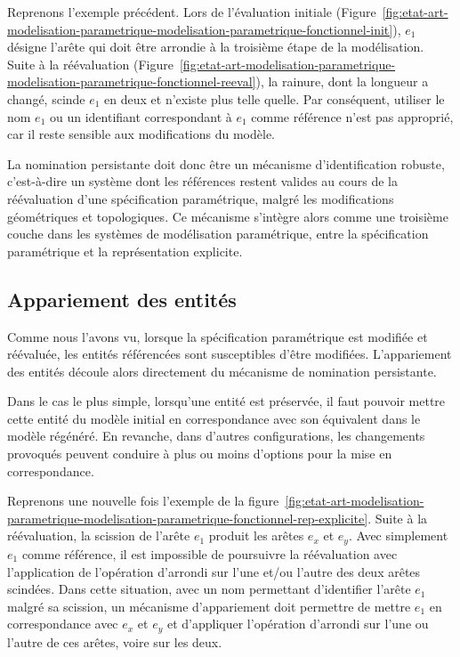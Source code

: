 Reprenons l'exemple précédent. %
Lors de l'évaluation initiale
(Figure~\ref{fig:etat-art-modelisation-parametrique-modelisation-parametrique-fonctionnel-init}),
$e_{1}$ désigne l'arête qui doit être arrondie à la troisième étape de la
modélisation. %
Suite à la réévaluation
(Figure~\ref{fig:etat-art-modelisation-parametrique-modelisation-parametrique-fonctionnel-reeval}),
la rainure, dont la longueur a changé, scinde $e_{1}$ en deux et n'existe plus
telle quelle. %
Par conséquent, utiliser le nom $e_{1}$ ou un identifiant correspondant à $e_{1}$ comme référence n'est pas approprié, car il reste sensible aux modifications du modèle.

La nomination persistante doit donc être un mécanisme d'identification robuste, c'est-à-dire un système dont les références restent valides au cours de la réévaluation d'une spécification paramétrique, malgré les modifications géométriques et topologiques. Ce mécanisme s'intègre alors comme une troisième couche dans les systèmes de modélisation paramétrique, entre la spécification paramétrique et la représentation explicite.

\subsection{Appariement des entités}
\label{sec:etat-art-modelisation-parametrique-nomination-appariement}

Comme nous l'avons vu, lorsque la spécification paramétrique est modifiée et
réévaluée, les entités référencées sont susceptibles d'être modifiées. %
L'appariement des entités découle alors directement du mécanisme de nomination
persistante. %

Dans le cas le plus simple, lorsqu'une entité est préservée, il faut pouvoir
mettre cette entité du modèle initial en correspondance avec son équivalent dans
le modèle régénéré. %
En revanche, dans d'autres configurations, les changements provoqués peuvent
conduire à plus ou moins d'options pour la mise en correspondance. %

Reprenons une nouvelle fois l'exemple de la
figure~\ref{fig:etat-art-modelisation-parametrique-modelisation-parametrique-fonctionnel-rep-explicite}. %
Suite à la réévaluation, la scission de l'arête $e_{1}$ produit les arêtes
$e_{x}$ et $e_{y}$. %
Avec simplement $e_{1}$ comme référence, il est impossible de poursuivre la
réévaluation avec l'application de l'opération d'arrondi sur l'une et/ou l'autre
des deux arêtes scindées. %
Dans cette situation, avec un nom permettant d'identifier l'arête $e_{1}$ malgré
sa scission, un mécanisme d'appariement doit permettre de mettre $e_{1}$ en
correspondance avec $e_{x}$ et $e_{y}$ et d'appliquer l'opération d'arrondi sur l'une ou l'autre de ces arêtes, voire sur les deux. %


